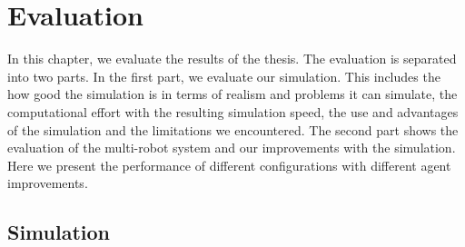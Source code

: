 \chapter{Evaluation}
\label{cha:evaluation}
In this chapter, we evaluate the results of the thesis. The evaluation is separated into two parts. In the first part, we evaluate our simulation. This includes the how good the simulation is in terms of realism and problems it can simulate, the computational effort with the resulting simulation speed, the use and advantages of the simulation and the limitations we encountered. The second part shows the evaluation of the multi-robot system and our improvements with the simulation. Here we present the performance of different configurations with different agent improvements.

\section{Simulation}
\label{sec:simulation}
